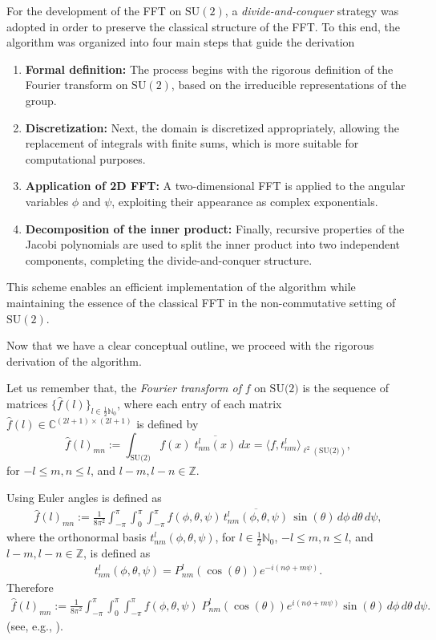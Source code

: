 \documentclass[11pt]{article}
\theoremstyle{definition}
\theoremstyle{remark}
\numberwithin{equation}{section}
\begin{document}
For the development of the FFT on $\text{SU}(2)$, a \textit{divide-and-conquer} strategy was adopted in order to preserve the classical structure of the FFT. To this end, the algorithm was organized into four main steps that guide the derivation
\begin{enumerate}
    \item  \textbf{Formal definition:} The process begins with the rigorous definition of the Fourier transform on $\text{SU}(2)$, based on the irreducible representations of the group.

    \item  \textbf{Discretization:} Next, the domain is discretized appropriately, allowing the replacement of integrals with finite sums, which is more suitable for computational purposes.

    \item \textbf{Application of 2D FFT:} A two-dimensional FFT is applied to the angular variables $\phi$ and $\psi$, exploiting their appearance as complex exponentials.

    \item \textbf{Decomposition of the inner product:} Finally, recursive properties of the Jacobi polynomials are used to split the inner product into two independent components, completing the divide-and-conquer structure.
\end{enumerate}
This scheme enables an efficient implementation of the algorithm while maintaining the essence of the classical FFT in the non-commutative setting of $\text{SU}(2)$.

Now that we have a clear conceptual outline, we proceed with the rigorous derivation of the algorithm.

Let us remember that, the \textit{Fourier transform of }$f$ on $\text{SU(2)}$ is the sequence of matrices $\{ \hat{f}(l) \}_{l \in \frac{1}{2} \mathbb{N}_0}$, where each entry of each matrix $\hat{f}(l) \in \mathbb{C}^{(2l+1) \times (2l+1)}$ is defined by
\[
\hat{f}(l)_{mn} := \int_{\text{SU(2)}} f(x) \; \overline{t^l_{nm}(x)} \, dx = \langle f, t^l_{nm} \rangle_{\ell^2(\text{SU(2)})},
\]
for $-l \leq m, n \leq l$, and $l - m, l - n \in \mathbb{Z}$.

Using Euler angles is defined as
\begin{align*}
    \hat{f}(l)_{mn} := \frac{1}{8\pi^2} \int_{-\pi}^{\pi} \int_0^{\pi} \int_{-\pi}^{\pi} f(\phi, \theta, \psi) \, \overline{t^l_{nm}(\phi, \theta, \psi)} \, \sin(\theta) \, d\phi \, d\theta \, d\psi,
\end{align*}
where the orthonormal basis $t_{nm}^l(\phi, \theta, \psi)$, for $l \in \frac{1}{2} \mathbb{N}_0$, $-l \leq m, n \leq l$, and $l - m, l - n \in \mathbb{Z}$, is defined as
\begin{align*}
    t_{nm}^l(\phi, \theta, \psi) = P_{nm}^l(\cos(\theta)) e^{-i(n\phi + m\psi)}.
\end{align*}
Therefore
\begin{align*}
    \hat{f}(l)_{mn} := \frac{1}{8\pi^2}\int_{-\pi}^{\pi} \int_0^{\pi} \int_{-\pi}^{\pi} f(\phi, \theta, \psi) \;P_{nm}^l(\cos(\theta)) e^{i(n\phi + m\psi)}  \sin(\theta) \, d\phi \, d\theta \, d\psi.
\end{align*}
(see, e.g., \cite{ruzhansky2009pseudo}).
\end{document}
